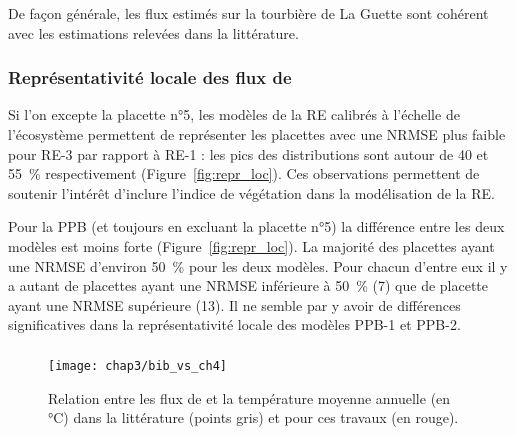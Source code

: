
De façon générale, les flux estimés sur la tourbière de La Guette sont cohérent avec les estimations relevées dans la littérature.


\subsubsection{Représentativité locale des flux de \coo}

Si l'on excepte la placette n°5, les modèles de la RE calibrés à l'échelle de l'écosystème permettent de représenter les placettes avec une NRMSE plus faible pour RE-3 par rapport à RE-1 : les pics des distributions sont autour de 40 et \SI{55}{\percent} respectivement (Figure~\ref{fig:repr_loc}).
Ces observations permettent de soutenir l'intérêt d'inclure l'indice de végétation dans la modélisation de la RE.

Pour la PPB (et toujours en excluant la placette n°5) la différence entre les deux modèles est moins forte (Figure~\ref{fig:repr_loc}).
La majorité des placettes ayant une NRMSE d'environ \SI{50}{\percent} pour les deux modèles.
Pour chacun d'entre eux il y a autant de placettes ayant une NRMSE inférieure à \SI{50}{\percent} (7) que de placette ayant une NRMSE supérieure (13).
Il ne semble par y avoir de différences significatives dans la représentativité locale des modèles PPB-1 et PPB-2.




\subsubsection{\fchh}

\begin{figure}
\centering
\texttt{[image: chap3/bib\_vs\_ch4]}
\caption{Relation entre les flux de \chh  et la température moyenne annuelle (en °C) dans la littérature (points gris) et pour ces travaux (en rouge).}
\label{fig:bib_vs_ch4}
\end{figure}

